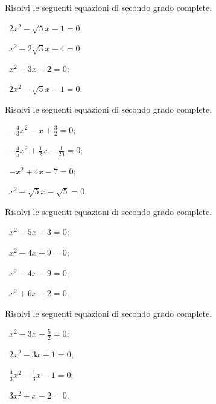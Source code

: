 \begin{esercizio}[\Ast]
 \label{ese:3.14}
Risolvi le seguenti equazioni di secondo grado complete.
\begin{multicols}{2}
 \begin{enumeratea}
 \item~$2 x^{2}-\sqrt{5} x-1 = 0$;
 \item~$x^{2}-2 \sqrt{3} x-4=0$;
 \item~$x^{2}-3 x-2=0$;
 \item~$2 x^{2}-\sqrt{5} x-1=0$.
 \end{enumeratea}
 \end{multicols}
\end{esercizio}
\pagebreak
\begin{esercizio}[\Ast]
 \label{ese:3.15}
Risolvi le seguenti equazioni di secondo grado complete.
\begin{multicols}{2}
 \begin{enumeratea}
 \item~$- \frac{4}{3} x^{2}-x + \frac{3}{2}=0$;
 \item~$- \frac{4}{5} x^{2} + \frac{1}{2} x-\frac{1}{20}=0$;
 \item~$- x^{2} + 4 x-7=0$;
 \item~$x^{2}-\sqrt{5} x-\sqrt{5}=0$.
 \end{enumeratea}
 \end{multicols}
\end{esercizio}

\begin{esercizio}[\Ast]
 \label{ese:3.16}
Risolvi le seguenti equazioni di secondo grado complete.
\begin{multicols}{2}
 \begin{enumeratea}
 \item~$x^{2}-5 x + 3 = 0$;
 \item~$x^{2}-4 x + 9 = 0$;
 \item~$x^{2}-4 x-9 = 0$;
 \item~$x^{2} + 6 x-2 = 0$.
 \end{enumeratea}
 \end{multicols}
\end{esercizio}

\begin{esercizio}[\Ast]
 \label{ese:3.17}
Risolvi le seguenti equazioni di secondo grado complete.
\begin{multicols}{2}
 \begin{enumeratea}
 \item~$x^{2}-3 x-\frac{5}{2} = 0$;
 \item~$2 x^{2}-3 x + 1 = 0$;
 \item~$\frac{4}{3} x^{2}-\frac{1}{3} x-1 = 0$;
 \item~$3 x^{2} + x-2 = 0$.
 \end{enumeratea}
 \end{multicols}
\end{esercizio}

